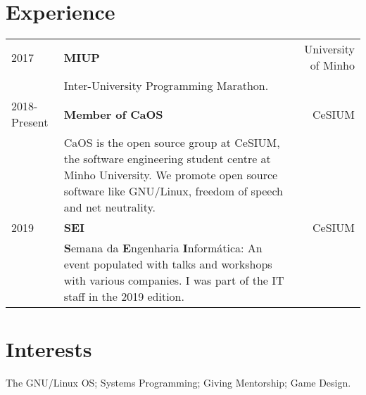 \documentclass{article}
\begin{document}
\begin{textblock}{7.3}
    \section{Experience}
    \begin{tabular}{lp{8.4cm}r}
        2017 & \textbf{MIUP} & University of Minho\\
        & Inter-University Programming Marathon. &\\
        2018-Present & \textbf{Member of CaOS} & CeSIUM\\
        & CaOS is the open source group at CeSIUM, the software engineering
        student centre at Minho University. We promote open source software
        like GNU/Linux, freedom of speech and net neutrality. &\\
        2019 & \textbf{SEI} & CeSIUM \\
        & \textbf{S}emana da \textbf{E}ngenharia \textbf{I}nformática: An event
        populated with talks and workshops with various companies. I was part of
        the IT staff in the 2019 edition. &\\
    \end{tabular}

    \section{Interests}
    The GNU/Linux OS\@; Systems Programming\@; Giving Mentorship\@; Game Design.

\end{textblock}
\end{document}
